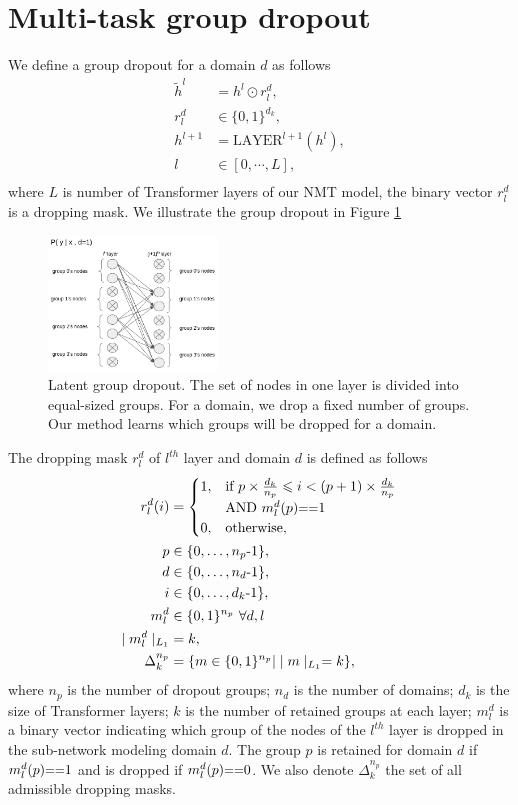 \documentclass[11pt]{article}
\begin{document}
\section{Multi-task group dropout}
We define a group dropout for a domain $d$ as follows
\begin{align*}
\tilde{h}^l &= h^l \odot r_l^d ,\\
r_l^d &\in \{ 0,1 \}^{d_k}, \\
h^{l+1} &= \text{LAYER}^{l+1}(h^l) ,\\
l & \in [0,\cdots,L] ,\\
\end{align*}
where $L$ is number of Transformer layers of our NMT model, the binary vector $r_l^d$ is a dropping mask. We illustrate the group dropout in Figure \ref{fig:group_dropout}
\begin{figure}
\includegraphics[width=0.4\textwidth]{group_dropout}
\caption{Latent group dropout. The set of nodes in one layer is divided into equal-sized groups. For a domain, we drop a fixed number of groups. Our method learns which groups will be dropped for a domain.}
\label{fig:group_dropout}
\end{figure}
 The dropping mask $r_l^d$ of $l^{th}$ layer and domain $d$ is defined as follows
\begin{align*}
r_l^d(i) &= \begin{cases}
      1, & \text{if}\ p \times \frac{d_k}{n_p} \leqslant i < (p+1) \times \frac{d_k}{n_p} \\
      & \text{AND} \  m_l^d(p) \text{\small ==} 1 \\
      0, & \text{otherwise},
    \end{cases} \\
p & \in  \{0,\dots,n_p\text{-}1 \}, \\
d & \in  \{0,\dots,n_d\text{-}1 \}, \\
i & \in  \{0,\dots,d_k\text{-}1 \}, \\
m_l^d & \in  \{0,1\}^{n_p} \ \forall d,l \, \\
\mid m_l^d \mid_{L_1} & =  k , \\
\Delta^{n_p}_k & =  \{ m \in \{0,1\}^{n_p} | \mid m \mid_{L_1} = k \},
\end{align*}
where $n_p$ is the number of dropout groups; $n_d$ is the number of domains; $d_k$ is the size of Transformer layers; $k$ is the number of retained groups at each layer; $m_l^d$ is a binary vector indicating which group of the nodes of the $l^{th}$ layer is dropped in the sub-network modeling domain $d$. The group $p$ is retained for domain $d$ if $m_l^d(p)\text{\small ==}1$ and is dropped if $m_l^d(p)\text{\small ==}0$. We also denote $\Delta^{n_p}_k$ the set of all admissible dropping masks. 
\end{document}
